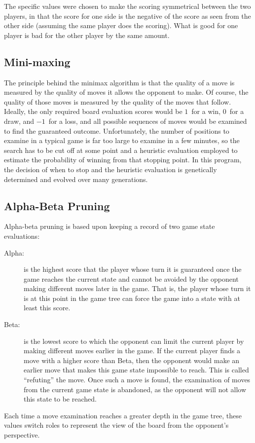 \documentclass[letterpaper]{article}
\renewcommand\_{\textunderscore\allowbreak}
\begin{document}
The specific values were chosen to make the scoring symmetrical between the two players, in that the score for one side is the negative of the score as seen from the other side (assuming the same player does the scoring). What is good for one player is bad for the other player by the same amount.

\subsection{Mini-maxing}

The principle behind the minimax algorithm is that the quality of a move is measured by the quality of moves it allows the opponent to make. Of course, the quality of those moves is measured by the quality of the moves that follow. Ideally, the only required board evaluation scores would be \(1\)~for a win, \(0\)~for a draw, and \(-1\)~for a loss, and all possible sequences of moves would be examined to find the guaranteed outcome. Unfortunately, the number of positions to examine in a typical game is far too large to examine in a few minutes, so the search has to be cut off at some point and a heuristic evaluation employed to estimate the probability of winning from that stopping point. In this program, the decision of when to stop and the heuristic evaluation is genetically determined and evolved over many generations.

\subsection{Alpha-Beta Pruning}

Alpha-beta pruning is based upon keeping a record of two game state evaluations:
\begin{description}
	\item[Alpha:] is the highest score that the player whose turn it is guaranteed once the game reaches the current state and cannot be avoided by the opponent making different moves later in the game. That is, the player whose turn it is at this point in the game tree can force the game into a state with at least this score.
	\item[Beta:] is the lowest score to which the opponent can limit the current player by making different moves earlier in the game. If the current player finds a move with a higher score than Beta, then the opponent would make an earlier move that makes this game state impossible to reach. This is called ``refuting'' the move. Once such a move is found, the examination of moves from the current game state is abandoned, as the opponent will not allow this state to be reached.
\end{description}
Each time a move examination reaches a greater depth in the game tree, these values switch roles to represent the view of the board from the opponent's perspective.
\end{document}
